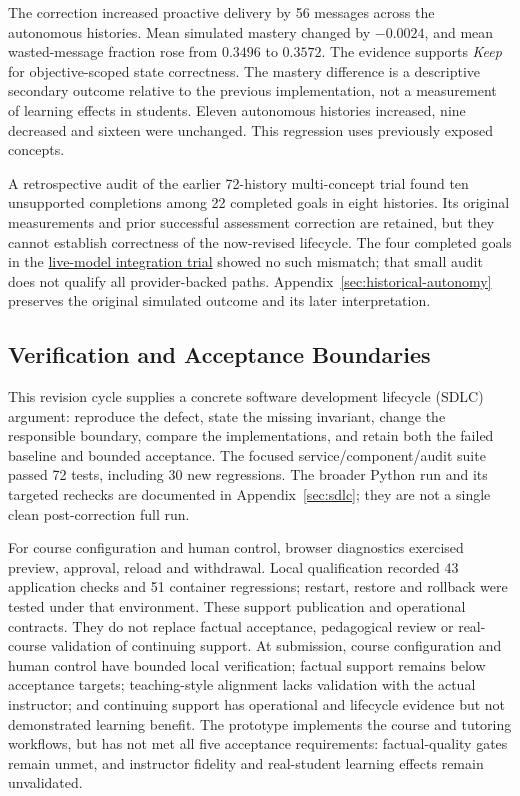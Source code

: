 The correction increased proactive delivery by 56 messages across the autonomous
histories. Mean simulated mastery changed by $-0.0024$, and mean wasted-message
fraction rose from $0.3496$ to $0.3572$. The evidence supports \emph{Keep} for
objective-scoped state correctness. The mastery difference is a descriptive
secondary outcome relative to the previous implementation, not a measurement
of learning effects in students. Eleven autonomous histories increased, nine
decreased and sixteen were unchanged. This regression uses previously exposed
concepts.

A retrospective audit of the earlier 72-history multi-concept trial
found ten unsupported completions among 22 completed goals in eight histories.
Its original measurements and prior successful assessment correction are
retained, but they cannot establish correctness of the now-revised lifecycle.
The four completed goals in the \hyperref[study-G]{live-model integration trial} showed no such mismatch; that small audit
does not qualify all provider-backed paths. Appendix~\ref{sec:historical-autonomy}
preserves the original simulated outcome and its later interpretation.

\subsection{Verification and Acceptance Boundaries}
This revision cycle supplies a concrete software development lifecycle (SDLC) argument: reproduce the defect,
state the missing invariant, change the responsible boundary, compare the
implementations, and retain both the failed baseline and bounded acceptance.
The focused service/component/audit suite passed 72 tests, including 30 new
regressions. The broader Python run and its targeted rechecks are documented in
Appendix~\ref{sec:sdlc}; they are not a single clean post-correction full run.

For course configuration and human control, browser diagnostics exercised preview, approval, reload and
withdrawal. Local qualification recorded 43 application checks and 51 container
regressions; restart, restore and rollback were tested under that environment.
These support publication and operational contracts. They do not replace factual acceptance, pedagogical review or real-course
validation of continuing support.
At submission, course configuration and human control have bounded local
verification; factual support remains below acceptance targets; teaching-style
alignment lacks validation with the actual instructor; and continuing support
has operational and lifecycle evidence but not demonstrated learning
benefit. The prototype implements the course and tutoring workflows, but has not met
all five acceptance requirements: factual-quality gates remain unmet, and
instructor fidelity and real-student learning effects remain unvalidated.
